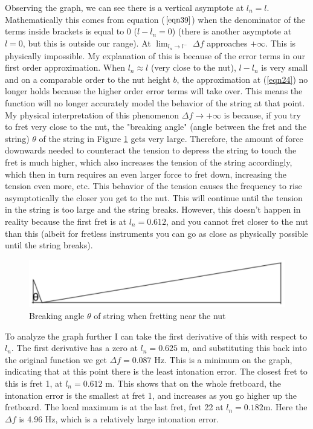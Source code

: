 Observing the graph, we can see there is a vertical asymptote at $l_n = l$. Mathematically this comes from equation ($\ref{eqn39}$) when the denominator of the terms inside brackets is equal to 0 ($l-l_n = 0$) (there is another asymptote at $l=0$, but this is outside our range). At $\lim_{l_n \to l^-}$ $\Delta f$ approaches $+\infty$. This is physically impossible. My explanation of this is because of the error terms in our first order approximation. When $l_n \approx l$ (very close to the nut), $l-l_n$ is very small and on a comparable order to the nut height $b$, the approximation at (\ref{eqn24}) no longer holds because the higher order error terms will take over. This means the function will no longer accurately model the behavior of the string at that point. My physical interpretation of this phenomenon $\Delta f \to +\infty $ is because, if you try to fret very close to the nut, the "breaking angle" (angle between the fret and the string) $\theta$ of the string in Figure \ref{fig8} gets very large. Therefore, the amount of force downwards needed to counteract the tension to depress the string to touch the fret is much higher, which also increases the tension of the string accordingly, which then in turn requires an even larger force to fret down, increasing the tension even more, etc. This behavior of the tension causes the frequency to rise asymptotically the closer you get to the nut. This will continue until the tension in the string is too large and the string breaks. However, this doesn't happen in reality because the first fret is at $l_n = 0.612$, and you cannot fret closer to the nut than this (albeit for fretless instruments you can go as close as physically possible until the string breaks). \par
\begin{figure}[!htb]
    \includegraphics[width=\textwidth]{./ee/breaking_angles.png}
    \caption{Breaking angle $\theta$ of string when fretting near the nut} \label{fig8}
\end{figure}
To analyze the graph further I can take the first derivative of this with respect to $l_n$. The first derivative has a zero at $l_n = 0.625$ m, and substituting this back into the original function we get $\Delta f = 0.087$ Hz. This is a minimum on the graph, indicating that at this point there is the least intonation error. The closest fret to this is fret 1, at $l_n = 0.612$ m. This shows that on the whole fretboard, the intonation error is the smallest at fret 1, and increases as you go higher up the fretboard. The local maximum is at the last fret, fret 22 at $l_n = 0.182 $m. Here the $\Delta f$ is 4.96 Hz, which is a relatively large intonation error.

